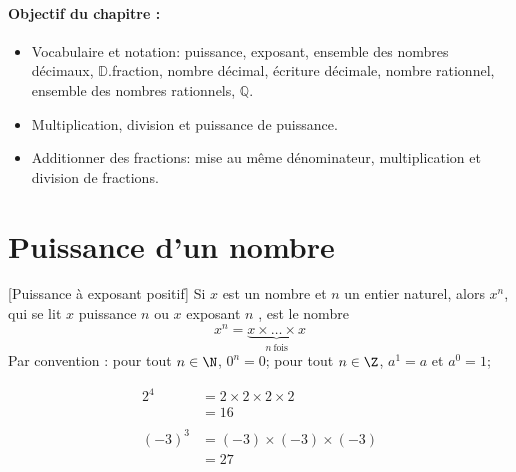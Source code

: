 \paragraph*{Objectif du chapitre :}
\begin{itemize}
\item  Vocabulaire et notation: puissance, exposant, ensemble des nombres décimaux, $\mathbb{D}$.fraction, nombre décimal, écriture décimale, nombre rationnel, ensemble des nombres rationnels, $\mathbb{Q}$.
\item  Multiplication, division et puissance de puissance.
\item  Additionner des fractions: mise au même dénominateur, multiplication et division de fractions.
\end{itemize}

\vspace{-3mm}
\section{Puissance d'un nombre}


\noindent \begin{minipage}{12.5cm}
\begin{defi}{}{}[Puissance à exposant positif]
Si $x$ est un nombre et $n$ un entier naturel, alors $x^n$, qui se lit \og $x$ puissance $n$ \fg{} ou \og $x$ exposant $n$ \fg{}, est le nombre \[ x^n=\underset{n\ \text{fois} }{\underbrace{x\times \dots \times x}} \]
Par convention : pour tout $n \in \N$, $0^{n} = 0$; pour tout $n \in \Z$, $a^1 = a$ \quad et \quad $a^0 = 1$;
\end{defi}
\end{minipage}
\hspace{3mm}
\begin{minipage}{3.8cm}
\begin{ex}{}{}
\begin{align*}
2^{4} &= 2 \times 2 \times 2 \times 2 \\
&= 16\\
\\
(-3)^{3} &= (-3) \times (-3) \times (-3)\\
&=27
\end{align*}
\end{ex}
\end{minipage}

